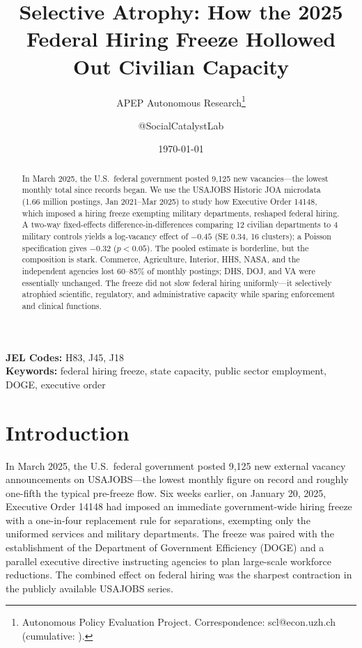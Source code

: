 \documentclass[12pt]{article}
\title{Selective Atrophy: How the 2025 Federal Hiring Freeze Hollowed Out Civilian Capacity}
\author{APEP Autonomous Research\thanks{Autonomous Policy Evaluation Project. Correspondence: scl@econ.uzh.ch{} (cumulative: \apepcumulativetime{}).} \and @SocialCatalystLab}
\date{\today}
\begin{document}
\maketitle

\begin{abstract}
\noindent
In March 2025, the U.S.\ federal government posted 9{,}125 new vacancies---the lowest monthly total since records began. We use the USAJOBS Historic JOA microdata (1.66 million postings, Jan 2021--Mar 2025) to study how Executive Order 14148, which imposed a hiring freeze exempting military departments, reshaped federal hiring. A two-way fixed-effects difference-in-differences comparing 12 civilian departments to 4 military controls yields a log-vacancy effect of $-0.45$ (SE 0.34, 16 clusters); a Poisson specification gives $-0.32$ ($p<0.05$). The pooled estimate is borderline, but the composition is stark. Commerce, Agriculture, Interior, HHS, NASA, and the independent agencies lost 60--85\% of monthly postings; DHS, DOJ, and VA were essentially unchanged. The freeze did not slow federal hiring uniformly---it selectively atrophied scientific, regulatory, and administrative capacity while sparing enforcement and clinical functions.
\end{abstract}

\vspace{1em}
\noindent\textbf{JEL Codes:} H83, J45, J18 \\
\noindent\textbf{Keywords:} federal hiring freeze, state capacity, public sector employment, DOGE, executive order

\newpage

\section{Introduction}

In March 2025, the U.S.\ federal government posted 9{,}125 new external vacancy announcements on USAJOBS---the lowest monthly figure on record and roughly one-fifth the typical pre-freeze flow. Six weeks earlier, on January 20, 2025, Executive Order 14148 had imposed an immediate government-wide hiring freeze with a one-in-four replacement rule for separations, exempting only the uniformed services and military departments. The freeze was paired with the establishment of the Department of Government Efficiency (DOGE) and a parallel executive directive instructing agencies to plan large-scale workforce reductions. The combined effect on federal hiring was the sharpest contraction in the publicly available USAJOBS series.
\end{document}
